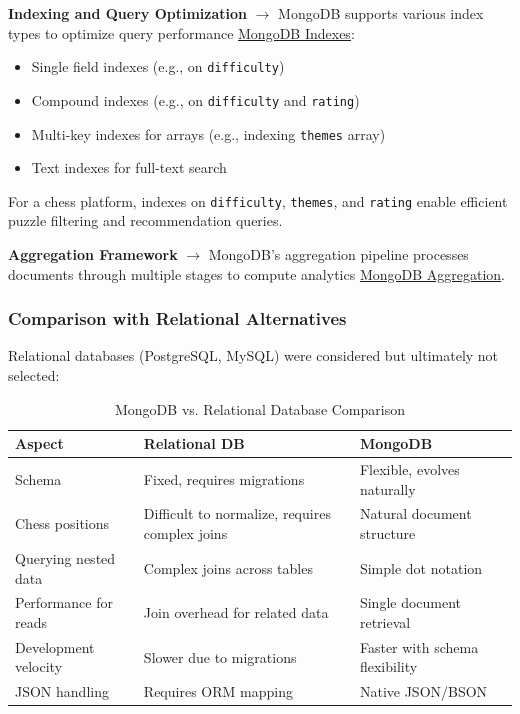 \textbf{Indexing and Query Optimization} $\rightarrow$ MongoDB supports various index types to optimize query performance \href{https://www.mongodb.com/docs/manual/indexes/}{MongoDB Indexes}:
\begin{itemize}
    \item Single field indexes (e.g., on \texttt{difficulty})
    \item Compound indexes (e.g., on \texttt{difficulty} and \texttt{rating})
    \item Multi-key indexes for arrays (e.g., indexing \texttt{themes} array)
    \item Text indexes for full-text search
\end{itemize}

For a chess platform, indexes on \texttt{difficulty}, \texttt{themes}, and \texttt{rating} enable efficient puzzle filtering and recommendation queries.

\textbf{Aggregation Framework} $\rightarrow$ MongoDB's aggregation pipeline processes documents through multiple stages to compute analytics \href{https://www.mongodb.com/docs/manual/aggregation/}{MongoDB Aggregation}.

\subsubsection*{Comparison with Relational Alternatives}

Relational databases (PostgreSQL, MySQL) were considered but ultimately not selected:

\begin{table}[!ht]
\centering
\label{tab:db-comparison}
\begin{tabular}
{|s|t|u|}
\hline
\textbf{Aspect} & \textbf{Relational DB} & \textbf{MongoDB} \\ \hline
Schema & Fixed, requires migrations & Flexible, evolves naturally \\ \hline
Chess positions & Difficult to normalize, requires complex joins & Natural document structure \\ \hline
Querying nested data & Complex joins across tables & Simple dot notation \\ \hline
Performance for reads & Join overhead for related data & Single document retrieval \\ \hline
Development velocity & Slower due to migrations & Faster with schema flexibility \\ \hline
JSON handling & Requires ORM mapping & Native JSON/BSON \\ \hline
\end{tabular}
\caption{MongoDB vs. Relational Database Comparison}
\end{table}


